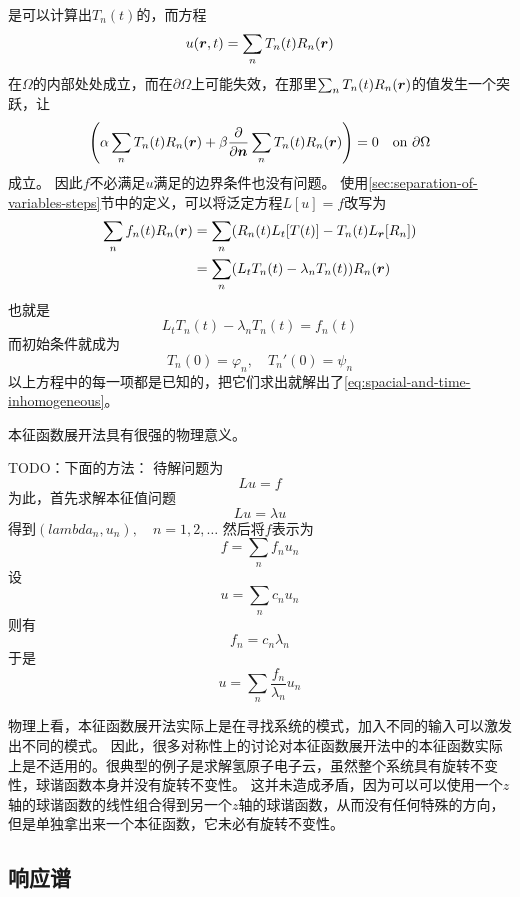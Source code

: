 \documentclass[UTF8]{ctexart}
\begin{document}
是可以计算出$T_n(t)$的，而方程
\[
    u(\vb*{r}, t) = \sum_n T_n(t) R_n(\vb*{r})
\]
在$\Omega$的内部处处成立，而在$\partial \Omega$上可能失效，在那里$\sum_n T_n(t) R_n(\vb*{r})$的值发生一个突跃，让
\[
    \left(\alpha \sum_n T_n(t) R_n(\vb*{r}) + \beta \pdv{\vb*{n}} \sum_n T_n(t) R_n(\vb*{r}) \right) = 0 \quad \text{on $\partial \Omega$}
\]
成立。
因此$f$不必满足$u$满足的边界条件也没有问题。
使用\ref{sec:separation-of-variables-steps}节中的定义，可以将泛定方程$L[u]=f$改写为
\[
    \begin{aligned}
        \sum_n f_n(t) R_n(\vb*{r}) &= \sum_n (R_n(t) L_t[T(t)] - T_n(t) L_{\vb*{r}}[R_n]) \\
        &= \sum_n (L_t T_n(t) - \lambda_n T_n(t)) R_n(\vb*{r})
    \end{aligned}
\]
也就是
\[
    L_t T_n(t) - \lambda_n T_n(t) = f_n(t)
\]
而初始条件就成为
\[
    T_n(0) = \varphi_n, \quad T_n'(0) = \psi_n
\]
以上方程中的每一项都是已知的，把它们求出就解出了\eqref{eq:spacial-and-time-inhomogeneous}。

本征函数展开法具有很强的物理意义。


TODO：下面的方法：
待解问题为
\[
    L u = f
\]
为此，首先求解本征值问题
\[
    L u = \lambda u
\]
得到$(lambda_n , u_n) , \quad n = 1, 2, \ldots$
然后将$f$表示为
\[
    f = \sum_n f_n u_n
\]
设
\[
    u = \sum_n c_n u_n
\]
则有
\[
    f_n = c_n \lambda_n
\]
于是
\[
    u = \sum_n \frac{f_n}{\lambda_n} u_n
\]

物理上看，本征函数展开法实际上是在寻找系统的模式，加入不同的输入可以激发出不同的模式。
因此，很多对称性上的讨论对本征函数展开法中的本征函数实际上是不适用的。很典型的例子是求解氢原子电子云，虽然整个系统具有旋转不变性，球谐函数本身并没有旋转不变性。
这并未造成矛盾，因为可以可以使用一个$z$轴的球谐函数的线性组合得到另一个$z$轴的球谐函数，从而没有任何特殊的方向，但是单独拿出来一个本征函数，它未必有旋转不变性。

\subsection{响应谱}
\end{document}

